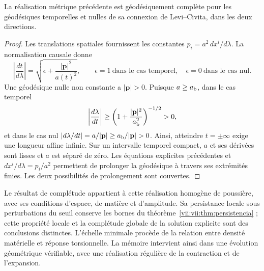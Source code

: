 \begin{proposition}
\label{vii:vii:prop:completitud-causal-polvo}
La réalisation métrique précédente est géodésiquement complète
pour les géodésiques temporelles et nulles de sa connexion de
Levi--Civita, dans les deux directions.
\end{proposition}
\begin{proof}
Les translations spatiales fournissent les constantes \(p_i=a^2\,dx^i/d\lambda\). La normalisation causale donne
\[
 \left|\frac{dt}{d\lambda}\right|
 =\sqrt{\epsilon+\frac{|\mathbf p|^2}{a(t)^2}},
 \qquad \epsilon=1\ \text{dans le cas temporel},\quad
 \epsilon=0\ \text{dans le cas nul}.
\]
Une géodésique nulle non constante a \(|\mathbf p|>0\). Puisque \(a\geq a_{\rm b}\), dans le cas temporel
\[
 \left|\frac{d\lambda}{dt}\right|
 \geq\left(1+\frac{|\mathbf p|^2}{a_{\rm b}^2}\right)^{-1/2}>0,
\]
et dans le cas nul
\(\left|d\lambda/dt\right|=a/|\mathbf p|
 \geq a_{\rm b}/|\mathbf p|>0\).
Ainsi, atteindre \(t=\pm\infty\) exige une longueur affine infinie.
Sur un intervalle temporel compact, \(a\) et ses dérivées sont
lisses et \(a\) est séparé de zéro. Les équations explicites
précédentes et \(dx^i/d\lambda=p_i/a^2\) permettent de prolonger la
géodésique à travers ses extrémités finies. Les deux possibilités
de prolongement sont couvertes.
\end{proof}

Le résultat de complétude appartient à cette réalisation homogène de
poussière, avec ses conditions d'espace, de matière et d'amplitude. Sa
persistance locale sous perturbations du seuil conserve les bornes
du théorème~\ref{vii:vii:thm:persistencia} ; cette propriété locale et la
complétude globale de la solution explicite sont des conclusions distinctes.
L'échelle minimale procède de la relation entre densité matérielle et
réponse torsionnelle. La mémoire intervient ainsi dans une évolution
géométrique vérifiable, avec une réalisation régulière de la contraction
et de l'expansion.
